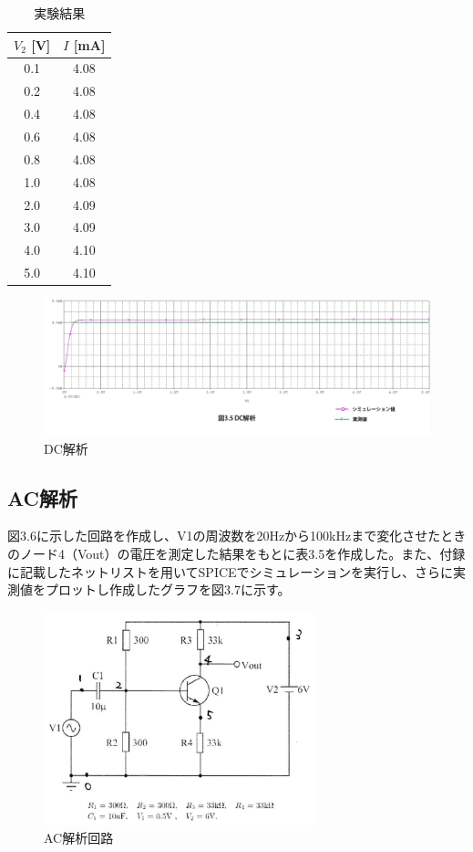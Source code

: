 \documentclass{jlreq}
\numberwithin{equation}{section}
\begin{document}
\begin{table}[H]
  \centering
  \caption{実験結果}
  \begin{tabular}{|c|c|}
    \hline
    \( V_{2} \) [V] & \( I\) [mA] \\ \hline
    0.1 & 4.08 \\ \hline
    0.2 & 4.08 \\ \hline
    0.4 & 4.08 \\ \hline
    0.6 & 4.08 \\ \hline
    0.8 & 4.08 \\ \hline
    1.0 & 4.08 \\ \hline
    2.0 & 4.09 \\ \hline
    3.0 & 4.09 \\ \hline
    4.0 & 4.10 \\ \hline
    5.0 & 4.10 \\ \hline
  \end{tabular}
\end{table}

\begin{figure}[H]
  \centering
  \includegraphics[width=\textwidth]{assets/dckaisekiplot.png}
  \caption{DC解析}
\end{figure}

\subsection{AC解析}
図3.6に示した回路を作成し、V1の周波数を20Hzから100kHzまで変化させたときのノード4（Vout）の電圧を測定した結果をもとに表3.5を作成した。また、付録に記載したネットリストを用いてSPICEでシミュレーションを実行し、さらに実測値をプロットし作成したグラフを図3.7に示す。

\begin{figure}[H]
  \centering
  \includegraphics[width=0.7\textwidth]{assets/ackaisekikairo.png}
  \caption{AC解析回路}
\end{figure}
\end{document}
